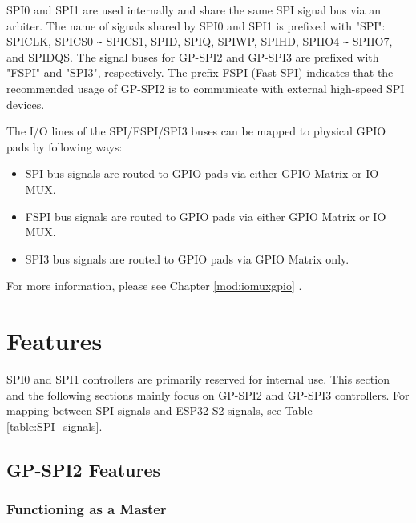 \documentclass[main\_\_EN.tex]{subfiles}
\begin{document}
SPI0 and SPI1 are used internally and share the same SPI signal bus via an arbiter. The name of signals shared by SPI0 and SPI1 is prefixed with "SPI": SPICLK, SPICS0 \verb+~+ SPICS1, SPID, SPIQ, SPIWP, SPIHD, SPIIO4 \verb+~+ SPIIO7, and SPIDQS. The signal buses for GP-SPI2 and GP-SPI3 are prefixed with "FSPI" and "SPI3", respectively. The prefix FSPI (Fast SPI) indicates that the recommended usage of GP-SPI2 is to communicate with external high-speed SPI devices.



The I/O lines of the SPI/FSPI/SPI3 buses can be mapped to physical GPIO pads by following ways:

\begin{itemize}
  \item SPI bus signals are routed to GPIO pads via either GPIO Matrix or IO MUX.
  \item FSPI bus signals are routed to GPIO pads via either GPIO Matrix or IO MUX.
  \item SPI3 bus signals are routed to GPIO pads via GPIO Matrix only.
\end{itemize}

For more information, please see Chapter \ref{mod:iomuxgpio} \textit{}.

\section{Features}

SPI0 and SPI1 controllers are primarily reserved for internal use. This section and the following sections mainly focus on GP-SPI2 and GP-SPI3 controllers. For mapping between SPI signals and ESP32-S2 signals, see Table \ref{table:SPI_signals}.

\subsection{GP-SPI2 Features}

\subsubsection{Functioning as a Master}
\end{document}

